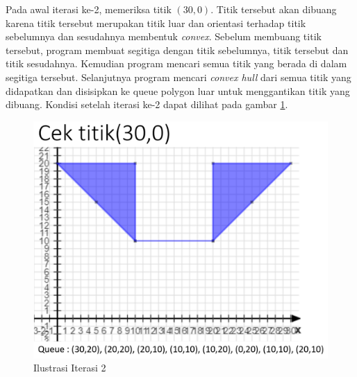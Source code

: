 \par Pada awal iterasi ke-2, memeriksa titik $(30,0)$. Titik tersebut akan dibuang karena titik tersebut merupakan titik luar dan orientasi terhadap titik sebelumnya dan sesudahnya membentuk \textit{convex}. Sebelum membuang titik tersebut, program membuat segitiga dengan titik sebelumnya, titik tersebut dan titik sesudahnya. Kemudian program mencari semua titik yang berada di dalam segitiga tersebut. Selanjutnya program mencari \textit{convex hull} dari semua titik yang didapatkan dan disisipkan ke queue polygon luar untuk menggantikan titik yang dibuang. Kondisi setelah iterasi ke-2 dapat dilihat pada gambar \ref{fig:iterasi-2}.
\begin{figure}[!h]
	\Centering
	\includegraphics [width=\columnwidth]{bab5/img/iterasi-2}
	\caption {Ilustrasi Iterasi 2}
	\label {fig:iterasi-2}
\end{figure}

